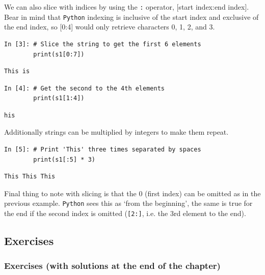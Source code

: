 We can also slice with indices by using the \texttt{:} operator, [start index:end index]. Bear in mind that \texttt{Python} indexing is inclusive of the start index and exclusive of the end index, so [0:4] would only retrieve characters 0, 1, 2, and 3.
\begin{lstlisting}[style=PY]
In [3]: # Slice the string to get the first 6 elements
        print(s1[0:7])
\end{lstlisting}
\begin{lstlisting}[style=PY_out]
        This is
\end{lstlisting}
\begin{lstlisting}[style=PY]
In [4]: # Get the second to the 4th elements
        print(s1[1:4])
\end{lstlisting}
\begin{lstlisting}[style=PY_out]
        his
\end{lstlisting}

Additionally strings can be multiplied by integers to make them repeat. 
\begin{lstlisting}[style=PY]
In [5]: # Print 'This' three times separated by spaces
        print(s1[:5] * 3)
\end{lstlisting}
\begin{lstlisting}[style=PY_out]
        This This This 
\end{lstlisting}
Final thing to note with slicing is that the 0 (first index) can be omitted as in the previous example. \texttt{Python} sees this as `from the beginning', the same is true for the end if the second index is omitted (\texttt{[2:]}, i.e. the 3rd element to the end).

\subsection{Exercises}
\subsubsection{Exercises (with solutions at the end of the chapter)}
\label{Strings}

